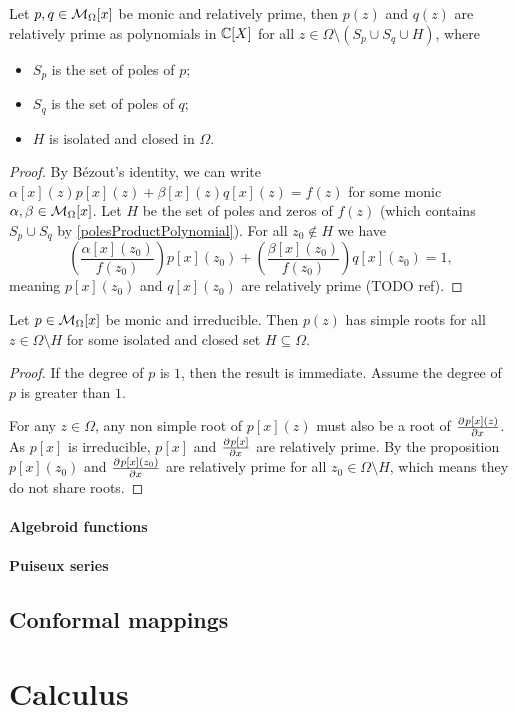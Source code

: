 \begin{proposition}
Let $p,q\in \operatorname{\mathcal{M}}_\Omega[x]$ be monic and relatively prime, then $p(z)$ and $q(z)$ are relatively prime as polynomials in $\mathbb{C}[X]$ for all $z\in \Omega \setminus (S_p \cup S_q \cup H)$, where
\begin{itemize}
    \item $S_p$ is the set of poles of $p$;
    \item $S_q$ is the set of poles of $q$;
    \item $H$ is isolated and closed in $\Omega$.
\end{itemize}
\end{proposition}
\begin{proof}
By Bézout's identity, we can write $\alpha[x](z)p[x](z) + \beta[x](z)q[x](z) = f(z)$ for some monic $\alpha,\beta\in \operatorname{\mathcal{M}}_\Omega[x]$. Let $H$ be the set of poles and zeros of $f(z)$ (which contains $S_p \cup S_q$ by \ref{polesProductPolynomial}). For all $z_0\notin H$ we have
\[ \left(\frac{\alpha[x](z_0)}{f(z_0)}\right)p[x](z_0) + \left(\frac{\beta[x](z_0)}{f(z_0)}\right)q[x](z_0) = 1, \]
meaning $p[x](z_0)$ and $q[x](z_0)$ are relatively prime (TODO ref).
\end{proof}
\begin{corollary}
Let $p\in \operatorname{\mathcal{M}}_\Omega[x]$ be monic and irreducible. Then $p(z)$ has simple roots for all $z\in\Omega\setminus H$ for some isolated and closed set $H\subseteq \Omega$.
\end{corollary}
\begin{proof}
If the degree of $p$ is $1$, then the result is immediate. Assume the degree of $p$ is greater than $1$.

For any $z\in \Omega$, any non simple root of $p[x](z)$ must also be a root of $ \frac{\partial{^{}}p[x](z)}{\partial{{x}^{}}} $. As $p[x]$ is irreducible, $p[x]$ and $ \frac{\partial{^{}}p[x]}{\partial{{x}^{}}} $ are relatively prime. By the proposition $p[x](z_0)$ and $ \frac{\partial{^{}}p[x](z_0)}{\partial{{x}^{}}} $ are relatively prime for all $z_0\in \Omega\setminus H$, which means they do not share roots.
\end{proof}

\subsubsection{Algebroid functions}

\subsubsection{Puiseux series}

\section{Conformal mappings}

\chapter{Calculus}


